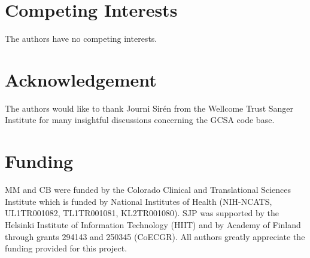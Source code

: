 \documentclass[letterpaper]{gbe}
\begin{document}
\section{Competing Interests}
The authors have no competing interests.


\section{Acknowledgement}
The authors would like to thank Journi Sir\'{e}n from the Wellcome Trust Sanger Institute for many insightful discussions concerning the GCSA code base.   
\section{Funding}
MM and CB were funded by the Colorado Clinical and Translational Sciences Institute which is funded by National Institutes of Health (NIH-NCATS, UL1TR001082, TL1TR001081, KL2TR001080).  SJP was supported by the Helsinki Institute of Information Technology (HIIT) and by Academy of Finland through grants 294143 and 250345 (CoECGR).  All authors greatly appreciate the funding provided for this project.  


%
%
%
%
%
%
%
%
%

{\small

%

}
\clearpage
\appendix
\
\end{document}
